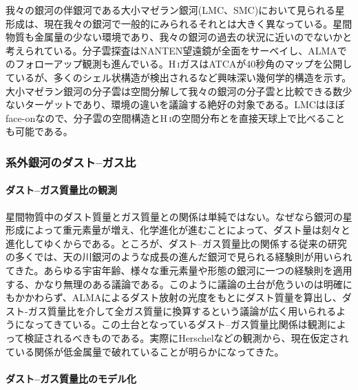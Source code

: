 我々の銀河の伴銀河である大小マゼラン銀河(LMC、SMC)において見られる星形成は、現在我々の銀河で一般的にみられるそれとは大きく異なっている。星間物質も金属量の少ない環境であり、我々の銀河の過去の状況に近いのでないかと考えられている。分子雲探査はNANTEN望遠鏡が全面をサーベイし、ALMAでのフォローアップ観測も進んでいる。H\,\textsc{i}ガスはATCAが40秒角のマップを公開しているが、多くのシェル状構造が検出されるなど興味深い幾何学的構造を示す。大小マゼラン銀河の分子雲は空間分解して我々の銀河の分子雲と比較できる数少ないターゲットであり、環境の違いを議論する絶好の対象である。LMCはほぼface-onなので、分子雲の空間構造とH\,\textsc{i}の空間分布とを直接天球上で比べることも可能である。

\subsubsection{系外銀河のダスト--ガス比}
\label{c08.s1.ss3.sss3}

\paragraph{ダスト--ガス質量比の観測}

星間物質中のダスト質量とガス質量との関係は単純ではない。なぜなら銀河の星形成によって重元素量が増え、化学進化が進むことによって、ダスト量は刻々と進化してゆくからである。ところが、ダスト--ガス質量比の関係する従来の研究の多くでは、天の川銀河のような成長の進んだ銀河で見られる経験則が用いられてきた。あらゆる宇宙年齢、様々な重元素量や形態の銀河に一つの経験則を適用する、かなり無理のある議論である。このように議論の土台が危ういのは明確にもかかわらず、ALMAによるダスト放射の光度をもとにダスト質量を算出し、ダスト-ガス質量比を介して全ガス質量に換算するという議論が広く用いられるようになってきている。この土台となっているダスト--ガス質量比関係は観測によって検証されるべきものである。実際にHerschelなどの観測から、現在仮定されている関係が低金属量で破れていることが明らかになってきた\citep{2014A&A...563A..31R}。

\paragraph{ダスト--ガス質量比のモデル化}

